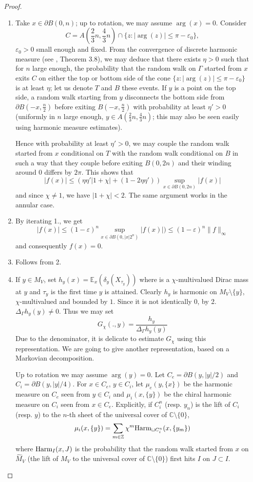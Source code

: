 \documentclass[10pt]{article}
\newcommand{\Z}{\mathbb{Z}}
\newcommand{\C}{\mathbb{C}}
\newcommand{\E}{\mathbb{E}}
\newcommand{\eps}{\varepsilon}
\newcommand{\Lap}{\Delta\!}
\begin{document}
\begin{proof}
\begin{enumerate}
\item Take $x\in\partial B(0,n)$; up to rotation, we may assume $\arg(x)=0$. Consider 
$$C=A(\frac 23 n,\frac 43n)\cap\{z:|\arg(z)|\leq \pi-\eps_0\},$$ 
$\eps_0>0$ small enough and fixed. From the convergence of discrete harmonic measure (see \cite{SmiChe_isoradial}, Theorem 3.8), we may deduce that there exists $\eta>0$ such that for $n$ large enough, the probability that the random walk on $\Gamma$ started from $x$ exits $C$ on either the top or bottom side of the cone $\{z:|\arg(z)|\leq \pi-\eps_0\}$ is at least $\eta$; let us denote $T$ and $B$ these events. If $y$  is a point on the top side, a random walk starting from $y$ disconnects the bottom side from $\partial B(-x,\frac n2)$ before exiting $B(-x,\frac n2)$ with probability at least $\eta'>0$ (uniformly in $n$ large enough, $y\in A(\frac 23 n,\frac 43n)$; this may also be seen easily using harmonic measure estimates).

Hence with probability at least $\eta'>0$, we may couple the random walk started from $x$ conditional on $T$ with the random walk conditional on $B$ in such a way that they couple before exiting $B(0,2n)$ and their winding around 0 differs by $2\pi$. This shows that
$$|f(x)|\leq \left(\eta\eta'|1+\chi|+(1-2\eta\eta')\right)\sup_{x\in \partial B(0,2n)}|f(x)|$$
and since $\chi\neq 1$, we have $|1+\chi|<2$. The same argument works in the annular case.

\item By iterating 1., we get 
$$|f(x)|\leq (1-\eps)^n\sup_{x\in \partial B(0,|x|2^n)}|f(x)|)\leq (1-\eps)^n\|f\|_\infty$$ 
and consequently $f(x)=0$.

\item Follows from 2.

\item 
If $y\in M_V$, set $h_y(x)=\E_x(\delta_y(X_{\tau_y}))$ where is a $\chi$-multivalued Dirac mass at $y$ and $\tau_y$ is the first time $y$ is attained. Clearly $h_y$ is harmonic on $M_V\setminus\{y\}$, $\chi$-multivalued and bounded by $1$. Since it is not identically $0$, by 2. $\Lap_\Gamma h_y(y)\neq 0$. Thus we may set
$$G_\chi(.,y)=\frac{h_y}{\Lap_\Gamma h_y(y)}$$
Due to the denominator, it is delicate to estimate $G_\chi$ using this representation. We are going to give another representation, based on a Markovian decomposition.

Up to rotation we may assume $\arg(y)=0$. Let $C_e=\partial B(y,|y|/2)$ and $C_i=\partial B(y,|y|/4)$. For $x\in C_e$, $y\in C_i$, let $\mu_e(y,\{x\})$ be the harmonic measure on $C_e$ seen from $y\in C_i$ and $\mu_i(x,\{y\})$ be the chiral harmonic measure on $C_i$ seen from $x\in C_e$. Explicitly, if $C^n_i$ (resp. $y_n$) is the lift of $C_i$ (resp. $y$) to the $n$-th sheet of the universal cover of $\C\setminus\{0\}$, 
$$\mu_i(x,\{y\})=\sum_{m\in \Z}\chi^m {\rm Harm}_{\sqcup C_i^n}(x,\{y_m\})$$
where ${\rm Harm}_I(x,J)$ is the probability that the random walk started from $x$ on $\hat M_V$ (the lift of $M_V$ to the universal cover of $\C\setminus\{0\}$) first hits $I$ on $J\subset I$.


\end{enumerate}
\end{proof}
\end{document}
